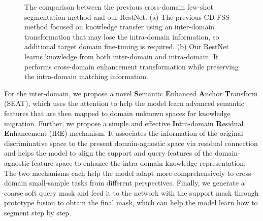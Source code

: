 \documentclass{bmvc2k}
\begin{document}
\begin{figure}[t]
	\centering
	\vspace{-3.5mm}
 \vspace {-0.5cm}
 \caption{The comparison between the previous cross-domain few-shot segmentation method and our RestNet.
(a) The previous CD-FSS method focused on knowledge transfer using an inter-domain transformation that may lose the intra-domain information, so additional target domain fine-tuning is required.
(b) Our RestNet learns knowledge from both inter-domain and intra-domain.
It performs cross-domain enhancement transformation while preserving the intra-domain matching information.} 
\end{figure}


For the inter-domain, we propose a novel \textbf{S}emantic \textbf{E}nhanced \textbf{A}nchor \textbf{T}ransform (SEAT), which uses the attention to help the model learn advanced semantic features that are then mapped to domain unknown spaces for knowledge migration.
Further, we propose a simple and effective \textbf{I}ntra-domain \textbf{R}esidual \textbf{E}nhancement (IRE) mechanism. 
It associates the information of the original discriminative space to the present domain-agnostic space via residual connection \cite{he2016deep} and helps the model to align the support and query features of the domain-agnostic feature space to enhance the intra-domain knowledge representation. 
The two mechanisms each help the model adapt more comprehensively to cross-domain small-sample tasks from different perspectives. 
Finally, we generate a coarse soft query mask and feed it to the network with the support mask through prototype fusion to obtain the final mask, which can help the model learn how to segment step by step.
\end{document}
